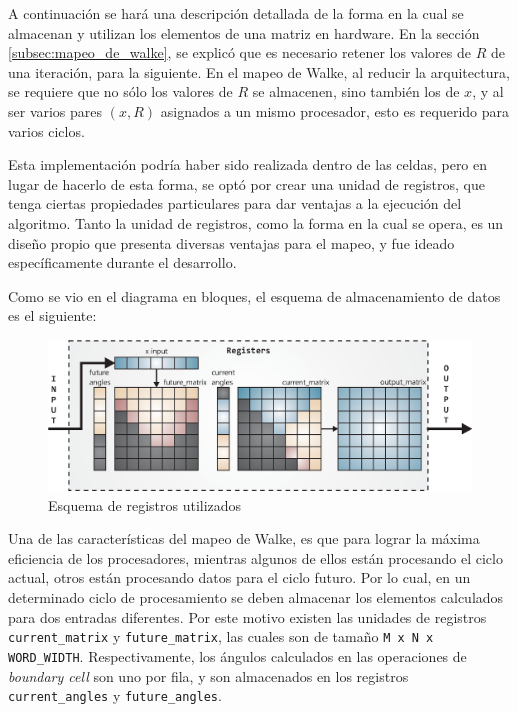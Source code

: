 A continuación se hará una descripción detallada de la forma en la cual se almacenan y utilizan los elementos de una matriz en hardware. En la sección \ref{subsec:mapeo_de_walke}, se explicó que es necesario retener los valores de $R$ de una iteración, para la siguiente. En el mapeo de Walke, al reducir la arquitectura, se requiere que no sólo los valores de $R$ se almacenen, sino también los de $x$, y al ser varios pares $(x,R)$ asignados a un mismo procesador, esto es requerido para varios ciclos.

Esta implementación podría haber sido realizada dentro de las celdas, pero en lugar de hacerlo de esta forma, se optó por crear una unidad de registros, que tenga ciertas propiedades particulares para dar ventajas a la ejecución del algoritmo. Tanto la unidad de registros, como la forma en la cual se opera, es un diseño propio que presenta diversas ventajas para el mapeo, y fue ideado específicamente durante el desarrollo.

Como se vio en el diagrama en bloques, el esquema de almacenamiento de datos es el siguiente:

\begin{figure}[!h]
 	\begin{center}
 		\includegraphics[width=15 cm]{./figures/C04-registers}
 		\caption{Esquema de registros utilizados}
		\label{fig:registers}
 	\end{center}
\end{figure}

Una de las características del mapeo de Walke, es que para lograr la máxima eficiencia de los procesadores, mientras algunos de ellos están procesando el ciclo actual, otros están procesando datos para el ciclo futuro. Por lo cual, en un determinado ciclo de procesamiento se deben almacenar los elementos calculados para dos entradas diferentes. Por este motivo existen las unidades de registros \verb;current_matrix; y \verb;future_matrix;, las cuales son de tamaño \verb;M x N x WORD_WIDTH;. Respectivamente, los ángulos calculados en las operaciones de \textit{boundary cell} son uno por fila, y son almacenados en los registros \verb;current_angles; y \verb;future_angles;.


